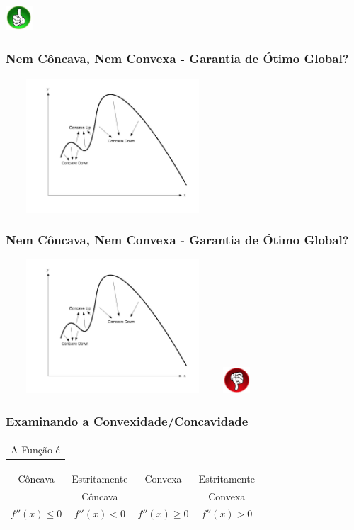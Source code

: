 \documentclass{beamer}
\begin{document}
\begin{frame}
{		\includegraphics[width=1cm,height=1cm]{sim.png}
	}	
	\only<5>
	{
		\frametitle{Nem Côncava, Nem Convexa - Garantia de Ótimo Global? }
		\includegraphics[width=8cm,height=5cm]{nemconcavonemconvexo.jpg}	
	}
	{
		\frametitle{Nem Côncava, Nem Convexa - Garantia de Ótimo Global? }
		\includegraphics[width=8cm,height=5cm]{nemconcavonemconvexo.jpg}	
		\includegraphics[width=1cm,height=1cm]{nao.png}
	}
\end{frame}

\begin{frame}
	\frametitle{Examinando a Convexidade/Concavidade}
	\begin{table}
		\begin{tabular}{c}
			A Função é \\
		\end{tabular}
		\begin{tabular}{c c c c}
			\hline
			\hline
			Côncava & Estritamente & Convexa & Estritamente \\
				    & Côncava      &         & Convexa      \\
			\hline
			$f''(x) \le 0$ & $f''(x) < 0$ & $f''(x) \ge 0$ & $f''(x) > 0$ \\
			\hline
			\hline
		\end{tabular}
	\end{table}
\end{frame}
\end{document}

